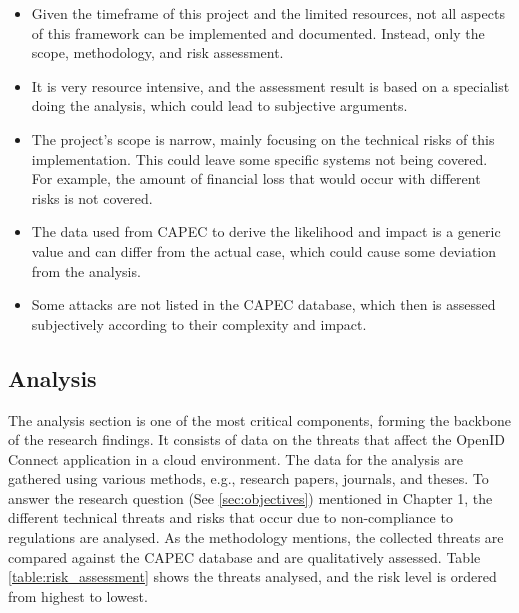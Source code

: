 \begin{itemize}
    \item Given the timeframe of this project and the limited resources, not all aspects of this framework can be implemented and documented. Instead, only the scope, methodology, and risk assessment.
    \item It is very resource intensive, and the assessment result is based on a specialist doing the analysis, which could lead to subjective arguments.
    \item The project's scope is narrow, mainly focusing on the technical risks of this implementation. This could leave some specific systems not being covered. For example, the amount of financial loss that would occur with different risks is not covered.
    \item The data used from CAPEC to derive the likelihood and impact is a generic value and can differ from the actual case, which could cause some deviation from the analysis.
    \item Some attacks are not listed in the CAPEC database, which then is assessed subjectively according to their complexity and impact. 
\end{itemize}

\subsection{Analysis}
 The analysis section is one of the most critical components, forming the backbone of the research findings. It consists of data on the threats that affect the OpenID Connect application in a cloud environment. The data for the analysis are gathered using various methods, e.g., research papers, journals, and theses. To answer the research question (See \ref{sec:objectives}) mentioned in Chapter 1, the different technical threats and risks that occur due to non-compliance to regulations are analysed. As the methodology mentions, the collected threats are compared against the CAPEC database and are qualitatively assessed. Table \ref{table:risk_assessment} shows the threats analysed, and the risk level is ordered from highest to lowest. 

